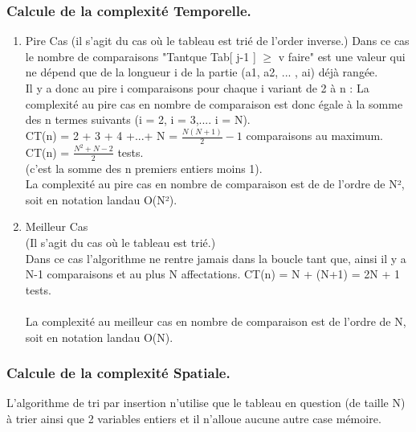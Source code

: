 \documentclass[12pt]{article}
\begin{document}
\subsubsection{Calcule de la complexité Temporelle. }
\begin{enumerate}
	\item Pire Cas
	(il s'agit du cas où le tableau est trié de l'order inverse.)
Dans ce cas le nombre de comparaisons "Tantque Tab[ j-1 ] $\ge$ v faire" est une valeur qui ne dépend que de la longueur i de la partie (a1, a2, ... , ai) déjà rangée.\\

Il y a donc au pire i comparaisons pour chaque i variant de 2 à n : 
La complexité au pire cas en nombre de comparaison est donc égale à la somme des n termes suivants (i = 2, i = 3,.... i = N).\\

\color{blue}
CT(n) =  2 + 3 + 4 +...+ N = $\frac{N(N+1)}{2}-1$ comparaisons au maximum.\\
CT(n) = $\frac{N^2 + N -2}{2}$ tests.
\color{black} \\
(c'est la somme des n premiers entiers moins 1).\\

La complexité au pire cas en nombre de comparaison est de de l'ordre de N², \\
\color{blue}
soit en notation landau O(N²).\\
\color{black}

	\item Meilleur Cas\\
	
	(Il s'agit du cas où le tableau est trié.)\\
	
Dans ce cas l'algorithme ne rentre jamais dans la boucle tant que, ainsi il y a N-1 comparaisons et au plus N affectations.
\color{blue}
CT(n) = N + (N+1) = 2N + 1 tests.\\
\color{black} \\
La complexité au meilleur cas en nombre de comparaison est de l'ordre de N, \\
\color{blue}
soit en notation landau O(N).\\
\color{black}

\end{enumerate}

\subsubsection{Calcule de la complexité Spatiale.}
L'algorithme de tri par insertion n'utilise que le tableau en question (de taille N) à trier ainsi que 2 variables entiers 
et il n'alloue aucune autre case mémoire.\\
\end{document}
